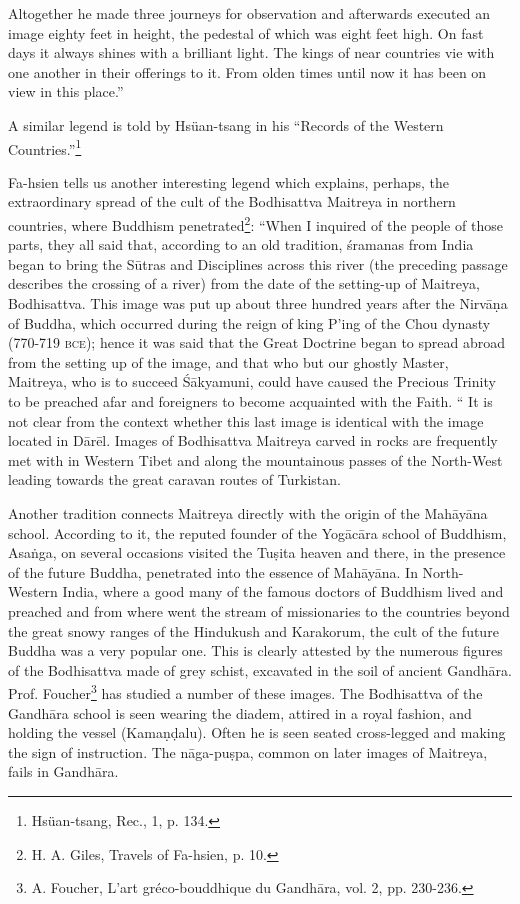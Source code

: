 \documentclass[a4paper, 12pt, oneside]{article}
\begin{document}
Altogether he made three journeys for observation and afterwards executed an image eighty feet in height, the pedestal of which was eight feet high. On fast days it always shines with a brilliant light. The kings of near countries vie with one another in their offerings to it. From olden times until now it has been on view in this place.''

A similar legend is told by Hsüan-tsang in his ``Records of the Western Countries.''\footnote{Hsüan-tsang, Rec., 1, p. 134.}

Fa-hsien tells us another interesting legend which explains, perhaps, the extraordinary spread of the cult of the Bodhisattva Maitreya in northern countries, where Buddhism penetrated\footnote{H. A. Giles, Travels of Fa-hsien, p. 10.}: ``When I inquired of the people of those parts, they all said that, according to an old tradition, \'{s}ramanas from India began to bring the S\={u}tras and Disciplines across this river (the preceding passage describes the crossing of a river) from the date of the setting-up of Maitreya, Bodhisattva. This image was put up about three hundred years after the Nirv\={a}\d{n}a of Buddha, which occurred during the reign of king P'ing of the Chou dynasty (770-719 \textsc{bce}); hence it was said that the Great Doctrine began to spread abroad from the setting up of the image, and that who but our ghostly Master, Maitreya, who is to succeed \'{S}\={a}kyamuni, could have caused the Precious Trinity to be preached afar and foreigners to become acquainted with the Faith. `` It is not clear from the context whether this last image is identical with the image located in D\={a}r\={e}l. Images of Bodhisattva Maitreya carved in rocks are frequently met with in Western Tibet and along the mountainous passes of the North-West leading towards the great caravan routes of Turkistan.

Another tradition connects Maitreya directly with the origin of the Mah\={a}y\={a}na school. According to it, the reputed founder of the Yog\={a}c\={a}ra school of Buddhism, Asa\.{n}ga, on several occasions visited the Tu\d{s}ita heaven and there, in the presence of the future Buddha, penetrated into the essence of Mah\={a}y\={a}na. In North-Western India, where a good many of the famous doctors of Buddhism lived and preached and from where went the stream of missionaries to the countries beyond the great snowy ranges of the Hindukush and Karakorum, the cult of the future Buddha was a very popular one. This is clearly attested by the numerous figures of the Bodhisattva made of grey schist, excavated in the soil of ancient Gandh\={a}ra. Prof. Foucher\footnote{A. Foucher, L'art gréco-bouddhique du Gandh\={a}ra, vol. 2, pp. 230-236.} has studied a number of these images. The Bodhisattva of the Gandh\={a}ra school is seen wearing the diadem, attired in a royal fashion, and holding the vessel (Kama\d{n}\d{d}alu). Often he is seen seated cross-legged and making the sign of instruction. The n\={a}ga-pu\d{s}pa, common on later images of Maitreya, fails in Gandh\={a}ra.
\end{document}
